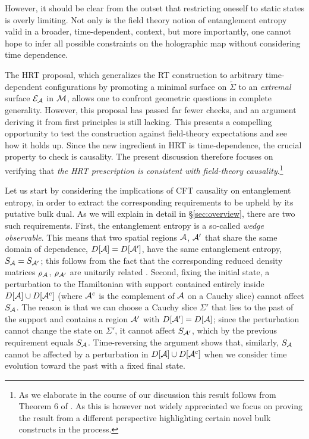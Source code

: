\documentclass[12pt]{article}
\def\bulk{{\cal M}}
\def\regA{{\cal A}}
\def\extr{{\cal E}_\regA}
\begin{document}
However, it should be clear from the outset that restricting oneself to static states is overly limiting.
Not only is the field theory notion of entanglement entropy valid in a broader, time-dependent, context, but more importantly,
one cannot hope to infer all possible constraints on the holographic map without considering time dependence.

The HRT proposal, which generalizes the RT construction to arbitrary time-de\-pend\-ent configurations by promoting a minimal surface on  ${\tilde \Sigma}$ to an {\it extremal} surface $\extr$ in $\bulk$, allows one to confront geometric questions in complete generality. However, this proposal has passed far fewer checks, and an argument deriving it from first principles is still lacking. This presents a compelling opportunity to test the construction against field-theory expectations and see how it holds up. Since the new ingredient in HRT  is time-dependence, the crucial property to check is causality. The present discussion therefore focuses on verifying that {\it the HRT prescription is consistent with field-theory causality}.\footnote{ As we elaborate in the course of our discussion this result follows from Theorem 6 of \cite{ Wall:2012uf}. As this is however not widely appreciated we focus on proving the result from a different perspective highlighting certain novel bulk constructs in the process.}

Let us start by considering the implications of CFT causality on entanglement entropy, in order to extract the corresponding requirements to be upheld by its putative bulk dual. As we will explain in detail in \S\ref{sec:overview}, there are two such requirements. First, the entanglement entropy is a so-called \emph{wedge observable}. This means that two spatial regions $\regA$, $\regA'$ that share the same domain of dependence, $D[\regA]=D[\regA']$, have the same entanglement entropy, $S_\regA=S_{\regA'}$; this follows from the fact that the corresponding reduced density matrices $\rho_\regA$, $\rho_{\regA'}$ are unitarily related \cite{Casini:2003ix}. Second, fixing the initial state, a perturbation to the Hamiltonian with support contained entirely inside $D[\regA]\cup D[\regA^c]$ (where $\regA^c$ is the complement of $\regA$ on a Cauchy slice) cannot affect $S_\regA$. The reason is that we can choose a Cauchy slice $\Sigma'$ that lies to the past of the support and contains a region $\regA'$ with $D[\regA']=D[\regA]$; since the perturbation cannot change the state on $\Sigma'$, it cannot affect $S_{\regA'}$, which by the previous requirement equals $S_\regA$. Time-reversing the argument shows that, similarly, $S_\regA$ cannot be affected by a perturbation in $D[\regA]\cup D[\regA^c]$ when we consider time evolution toward the past with a fixed final state.
\end{document}
